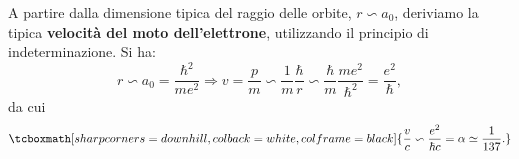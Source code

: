 \documentclass[a4paper,12pt,oneside]{book}
\begin{document}
A partire dalla dimensione tipica del raggio delle orbite, $r \backsim a_0$, deriviamo la tipica \textbf{velocità del moto dell'elettrone}, utilizzando il principio di indeterminazione. Si ha:
	\begin{equation}
		r   \backsim   a_0 =\frac{\hbar ^2}{me^2}  \Rightarrow   v=\frac{p}{m} \backsim \frac{1}{m} \frac{\hbar}{r}\backsim \frac{\hbar}{m}\frac{me^2}{\hbar ^2}=\frac{e^2}{\hbar}, 
	\end{equation}
da cui
	\begin{equation}
		\tcboxmath[sharp corners=downhill, colback=white, colframe=black]{
			\frac{v}{c}\backsim \frac{e^2}{\hbar c}=\alpha \simeq \frac{1}{137}.
			}
	\end{equation}
\end{document}
